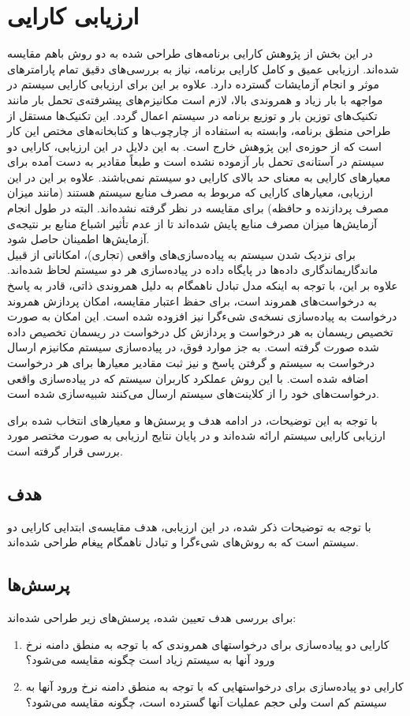 \section{ارزیابی کارایی}
\label{sec:perf}
در این بخش از پژوهش کارایی برنامه‌های طراحی‌ شده به دو روش باهم مقایسه شده‌اند. ارزیابی عمیق و کامل کارایی برنامه، نیاز به بررسی‌های دقیق تمام پارامترهای موثر و انجام آزمایشات گسترده دارد. علاوه بر این برای ارزیابی کارایی سیستم در مواجهه با بار زیاد و همروندی بالا، لازم است مکانیزم‌های پیشرفته‌ی تحمل بار مانند تکنیک‌های \gls{توزین بار} و توزیع برنامه در سیستم اعمال گردد. این تکنیک‌ها مستقل از طراحی منطق برنامه، وابسته به استفاده از چارچوب‌ها و کتابخانه‌های مختص این کار است که از حوزه‌ی این پژوهش خارج است. به این دلایل در این ارزیابی، کارایی دو سیستم در آستانه‌ی تحمل بار آزموده نشده است و طبعاً مقادیر به دست آمده برای معیارهای کارایی به معنای حد بالای کارایی دو سیستم نمی‌باشند. علاوه‌ بر این در این ارزیابی، معیارهای کارایی که مربوط به مصرف منابع سیستم هستند (مانند میزان مصرف پردازنده و حافظه) برای مقایسه در نظر گرفته نشده‌اند. البته در طول انجام آزمایش‌ها میزان مصرف منابع پایش شده‌اند تا از عدم  تأثیر اشباع منابع بر نتیجه‌ی آزمایش‌ها اطمینان حاصل شود.\\
برای نزدیک شدن سیستم به پیاده‌سازی‌های واقعی (تجاری)، امکاناتی از قبیل ماندگاری\gls{ماندگاری} داده‌ها در پایگاه داده در پیاده‌سازی هر دو سیستم لحاظ شده‌اند. علاوه بر این، با توجه به اینکه مدل تبادل ناهمگام به دلیل همروندی ذاتی، قادر به پاسخ به درخواست‌های همروند است، برای حفظ اعتبار مقایسه، امکان پردازش همروند درخواست به پیاده‌سازی نسخه‌ی شیءگرا نیز افزوده شده است. این امکان به صورت تخصیص ریسمان به هر درخواست و پردازش کل درخواست در ریسمان تخصیص داده شده صورت گرفته است. به جز موارد فوق، در پیاده‌سازی سیستم مکانیزم ارسال درخواست به سیستم و گرفتن پاسخ و نیز ثبت مقادیر معیارها برای هر درخواست اضافه شده است. با این روش عملکرد کاربران سیستم که در پیاده‌سازی واقعی درخواست‌های خود را از کلاینت‌های سیستم ارسال می‌کنند شبیه‌سازی شده است.

با توجه به این توضیحات، در ادامه هدف و پرسش‌ها و معیارهای انتخاب شده برای ارزیابی کارایی سیستم ارائه شده‌اند و در پایان نتایج ارزیابی به صورت مختصر مورد بررسی قرار گرفته است.
\subsection{هدف}
با توجه به توضیحات ذکر شده، در این ارزیابی، هدف مقایسه‌ی ابتدایی کارایی دو سیستم است که به روش‌های شیءگرا و تبادل ناهمگام پیغام طراحی شده‌اند. 
\subsection{پرسش‌ها}
برای بررسی هدف تعیین شده، پرسش‌های زیر طراحی شده‌اند:
\begin{enumerate}
\item کارایی دو پیاده‌سازی برای درخواستهای همروندی که با توجه به منطق دامنه نرخ ورود آنها به سیستم زیاد است چگونه مقایسه می‌شود؟\\

\item کارایی دو پیاده‌سازی برای درخواستهایی که با توجه به منطق دامنه نرخ ورود آنها به سیستم کم است ولی حجم عملیات آنها گسترده است، چگونه مقایسه می‌شود؟

\end{enumerate}
